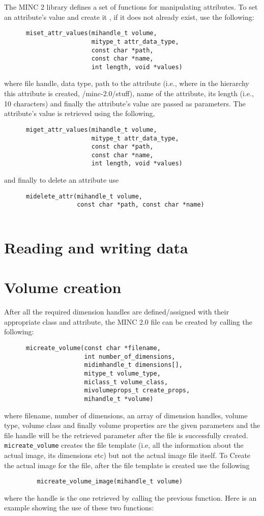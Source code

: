 \documentclass{article}
\begin{document}
The MINC 2 library defines a set of functions for manipulating attributes. To set 
an attribute's value and
create it , if it does not already exist, use the following:
\begin{verbatim}
      miset_attr_values(mihandle_t volume, 
                        mitype_t attr_data_type,
                        const char *path, 
                        const char *name,
                        int length, void *values)
\end{verbatim}
where file handle, data type, path to the attribute (i.e., where in the hierarchy this
attribute is created, /minc-2.0/stuff), name of the attribute, its length (i.e., 10 
characters) and finally the attribute's value are passed as parameters. 
The attribute's value is retrieved using the following,
\begin{verbatim}
      miget_attr_values(mihandle_t volume,
                        mitype_t attr_data_type,
                        const char *path, 
                        const char *name,
                        int length, void *values)
\end{verbatim}
and finally to delete an attribute use
\begin{verbatim}
      midelete_attr(mihandle_t volume, 
                    const char *path, const char *name)
                       
\end{verbatim}
\section{Reading and writing data}
\section{Volume creation}
After all the required dimension handles are defined/assigned with their appropriate 
class and attribute, the MINC 2.0 file can be created by calling the following:
\begin{verbatim}
      micreate_volume(const char *filename, 
                      int number_of_dimensions,
                      midimhandle_t dimensions[], 
                      mitype_t volume_type,
                      miclass_t volume_class, 
                      mivolumeprops_t create_props,
                      mihandle_t *volume)
\end{verbatim}
where filename, number of dimensions, an array of dimension handles, volume type, 
volume class and finally volume properties are the given parameters and the file handle
will be the  retrieved parameter after the file is successfully created.
{\tt micreate\_volume} creates the file template (i.e, all the information about the actual
image, its dimensions etc) but not the actual image file itself.
To Create the actual image for the file, after the file template is created use the following
\begin{verbatim}
         micreate_volume_image(mihandle_t volume)
\end{verbatim}
where the handle is the one retrieved by calling the previous function.    
Here is an example showing the use of these two functions:
\end{document}
